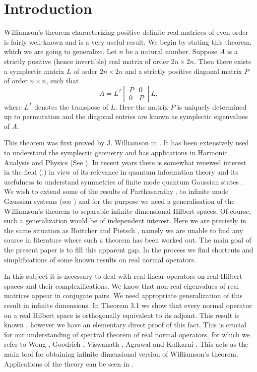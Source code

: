\documentclass[12pt,a4paper,twoside]{article}
\numberwithin{equation}{section}
\theoremstyle{definition}  %
\theoremstyle{plain}  %
\theoremstyle{remark} %
\begin{document}
\section{Introduction}



 Williamson's  theorem characterizing positive definite
real matrices of even order is fairly well-known and is a very
useful result. We begin by stating this theorem, which we are going
to generalize. Let $n$ be a natural number. Suppose $A$ is a
strictly positive (hence invertible) real matrix of order $2n\times
2n$. Then there exists a symplectic matrix $L$ of order $2n\times 2n$
and a strictly positive diagonal matrix $P$ of order $n\times n$, such that
$$A= L^T
\begin{bmatrix}
  P &0\\
  0&P
\end{bmatrix}L,
$$  where $L^T$ denotes the transpose of $L.$ Here the matrix $P$ is uniquely determined up to permutation and the
diagonal entries are  known as symplectic eigenvalues of $A$.

This theorem was first proved by J. Williamson in \cite{Wil36}. It
has been extensively used to understand the symplectic geometry and
has applications in Harmonic Analysis and  Physics (See \cite{Gos11}).
 In recent years there is somewhat renewed interest in the field (\cite{BhJa15},\cite{IdGaWo17}) in
view of its relevance in quantum information theory and its
usefulness to understand symmetries of finite mode quantum Gaussian
states \cite{Par13}. We wish to extend some of the results of Parthasarathy 
\cite{Par13}, to infinite mode Gaussian systems  (see \cite{BhJoSr18}) and for the purpose we need a generalisation of the
Williamson's theorem to separable infinite dimensional Hilbert
spaces. Of course, such a generalization would be of independent
interest. Here we are precisely in the same situation as B\"ottcher and Pietsch \cite{Bot12}, namely we are unable to find any source in literature
where such a theorem has been worked out. The main goal of the present
paper is to fill this apparent gap. In the process we find shortcuts and simplifications of some known results on real normal operators.

In this subject it is necessary  to deal with real linear operators on real
Hilbert spaces and their complexifications. We know that non-real eigenvalues of real matrices
appear in conjugate pairs. We need appropriate generalization of
this result in infinite dimensions. In Theorem 3.1 we show that
every normal operator on a real Hilbert space is orthogonally
equivalent to its adjoint. This result is known \cite{Vis78}, however we
have an elementary direct proof of this fact. This is crucial for
our understanding of spectral theorem of real normal operators, for
which we refer to Wong \cite{Wong69}, Goodrich \cite{Goo72}, Viswanath \cite{Vis78}, Agrawal and Kulkarni \cite{AgKu94}. This acts as the  main tool for
obtaining infinite dimensional version of Williamson's theorem.
Applications of the theory can be seen in \cite{BhJoSr18}.
\end{document}
